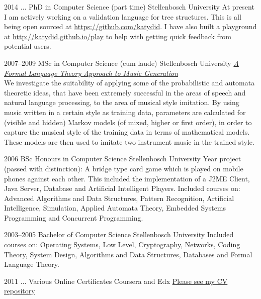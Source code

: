\documentclass[]{friggeri-cv} %
\begin{document}

\begin{entrylist}

\entry
{2014 ...}
{PhD {\normalfont in Computer Science} (part time)}
{Stellenbosch University}
{At present I am actively working on a validation language for tree structures.
This is all being open sourced at \href{https://github.com/katydid}{https://github.com/katydid}.
I have also built a playground at \href{http://katydid.github.io/play}{http://katydid.github.io/play} to help with getting quick feedback from potential users.}

\entry
{2007--2009}
{MSc {\normalfont in Computer Science} (cum laude)}
{Stellenbosch University}
{\href{http://superwillow.sourceforge.net/}{\emph{A Formal Language Theory Approach to Music Generation}} \\ We investigate the suitability of applying some of the probabilistic and automata theoretic ideas, that have been extremely successful in the areas of speech and natural language processing, to the area of musical style imitation. By using music written in a certain style as training data, parameters are calculated for (visible and hidden) Markov models (of mixed, higher or first order), in order to capture the musical style of the training data in terms of mathematical models. These models are then used to imitate two instrument music in the trained style.}

\end{entrylist}

\begin{entrylist}

\entry
{2006}
{BSc Honours {\normalfont in Computer Science}}
{Stellenbosch University}
{Year project (passed with distinction): A bridge type card game which is played on mobile phones against each other. This included the implementation of a J2ME Client, Java Server, Database and Artificial Intelligent Players.
Included courses on: Advanced Algorithms and Data Structures, Pattern Recognition, Artificial Intelligence, Simulation, Applied Automata Theory, Embedded Systems Programming and Concurrent Programming.}

\entry
{2003--2005}
{Bachelor {\normalfont of Computer Science}}
{Stellenbosch University}
{Included courses on: Operating Systems, Low Level, Cryptography, Networks, Coding Theory, System Design, Algorithms and Data Structures, Databases and Formal Language Theory.}

\entry
{2011 ...}
{Various Online Certificates}
{Coursera and Edx}
{\href{https://github.com/awalterschulze/waltercv}{Please see my CV repository}}

\end{entrylist}
\end{document}
